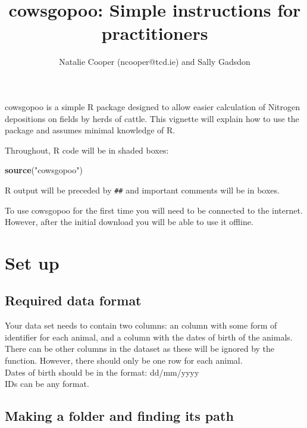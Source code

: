 \documentclass[12pt]{article}
\newcommand{\KeywordTok}[1]{\textcolor[rgb]{0.13,0.29,0.53}{\textbf{{#1}}}}
\newcommand{\StringTok}[1]{\textcolor[rgb]{0.31,0.60,0.02}{{#1}}}
\newcommand{\NormalTok}[1]{{#1}}
\begin{document}
\title{cowsgopoo: Simple instructions for practitioners}
\author{Natalie Cooper (ncooper@tcd.ie) and Sally Gadsdon}
\date{}
\maketitle

cowsgopoo is a simple R package designed to allow easier calculation of Nitrogen depositions
on fields by herds of cattle. This vignette will explain how to use the package and assumes
minimal knowledge of R.

Throughout, R code will be in shaded boxes:

\begin{snugshade}
\begin{Highlighting}[]
\KeywordTok{source}\NormalTok{(}\StringTok{"cowsgopoo"}\NormalTok{)}
\end{Highlighting}
\end{snugshade}

R output will be preceded by \texttt{\#\#} and important comments will be in boxes.

\begin{framed}
To use cowsgopoo for the first time you will need to be connected to the internet. However, after the initial download you will be able to use it offline.
\end{framed}

\section{Set up}

\subsection{Required data format}

Your data set needs to contain two columns: an column with some form of identifier for each animal, and a column with the dates of birth of the animals. There can be other columns in the dataset as these will be ignored by the function. However, there should only be one row for each animal.\\

Dates of birth should be in the format: dd/mm/yyyy\\

IDs can be any format.\\

\subsection{Making a folder and finding its path}
\end{document}
